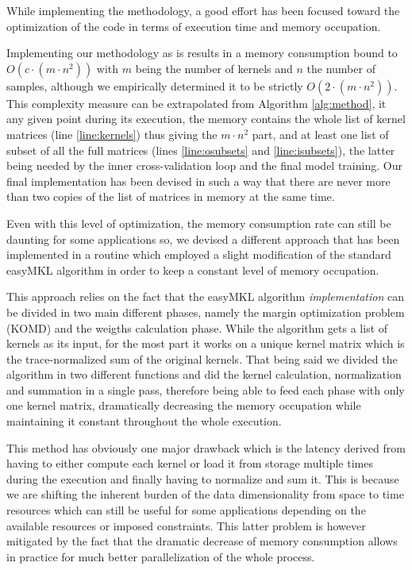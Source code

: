 While implementing the methodology, a good effort has been focused toward the
optimization of the code in terms of execution time and memory occupation.

Implementing our methodology as is results in a memory consumption bound to
$O(c \cdot (m\cdot n^2))$ with $m$ being the number of kernels and $n$ the number of samples,
although we empirically determined it to be strictly $O(2\cdot (m\cdot n^2))$.
This complexity measure can be extrapolated from  Algorithm \ref{alg:method},
it any given point during its execution, the memory contains the whole list
of kernel matrices (line \ref{line:kernels}) thus giving the $m\cdot n^2$ part,
and at least one list of subset of all the full matrices (lines \ref{line:osubsets}
and \ref{line:isubsets}), the latter being needed by the inner cross-validation
loop and the final model training.  Our final implementation has been devised in
such a way that there are never more than two copies of the list of matrices in
memory at the same time.  

Even with this level of optimization, the memory consumption rate can still be
daunting for some applications so, we devised a different approach that has been
implemented in a routine which employed a slight modification of the standard
easyMKL algorithm \cite{aiolli2015easymkl} in order to keep a constant level of memory
occupation.

This approach relies on the fact that the easyMKL algorithm \emph{implementation}
can be divided in two main different phases, namely the margin optimization problem
(KOMD) and the weigths calculation phase.
While the algorithm gets a list of kernels as its input, for the most part
it works on a unique kernel matrix which is the trace-normalized sum of the 
original kernels.
That being said we divided the algorithm in two different functions and did
the kernel calculation, normalization and summation in a single pass, therefore
being able to feed each phase with only one kernel matrix, dramatically decreasing
the memory occupation while maintaining it constant throughout the whole execution.

This method has obviously one major drawback which is the latency derived from
having to either compute each kernel or load it from storage multiple times
during the execution and finally having to normalize and sum it.
This is because we are shifting the inherent burden of the data dimensionality
from space to time resources which can still be useful for some applications
depending on the available resources or imposed constraints.
This latter problem is however mitigated by the fact that the dramatic decrease
of memory consumption allows in practice for much better parallelization of the
whole process.

